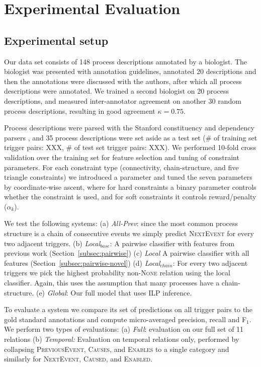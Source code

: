 \section{Experimental Evaluation}

\subsection{Experimental setup}

Our data set consists of 148 process descriptions annotated by a biologist. The biologist was presented with annotation guidelines, annotated 20 descriptions and then the annotations were discussed with the authors, after which all process descriptions were annotated. We trained a second biologist on 20 process descriptions, and measured inter-annotator agreement on another 30 random process descriptions, resulting in good agreement $\kappa=0.75$. 

Process descriptions were parsed with the Stanford constituency and dependency parsers \cite{Klein03,Marneffe06}, and 35 process descriptions were set aside as a test set (\# of training set trigger pairs: XXX, \# of test set trigger pairs: XXX). We performed 10-fold cross validation over the training set for feature selection and tuning of constraint parameters. For each constraint type (connectivity, chain-structure, and five triangle constraints) we introduced a parameter and tuned the seven parameters by coordinate-wise ascent, where for hard constraints a binary parameter controls whether the constraint is used, and for soft constraints it controls reward/penalty ($\alpha_k$).

We test the following systems: (a) \emph{All-Prev}: since the most common process structure is a chain of consecutive events we simply predict \textsc{NextEvent} for every two adjacent triggers. (b) \emph{Local$_{base}$}: A pairwise classifier with features from previous work (Section~\ref{subsec:pairwise}) (c) \emph{Local} A pairwise classifier with all features (Section~\ref{subsec:pairwise-novel}) (d) \emph{Local$_{chain}$}: For every two adjacent triggers we pick the highest probability non-\textsc{None} relation using the local classifier. Again, this uses the assumption that many processes have a chain-structure. (e) \emph{Global}: Our full model that uses ILP inference.

To evaluate a system we compare its set of predictions on all trigger pairs to the gold standard annotations and compute micro-averaged precision, recall and F$_1$. We perform two types of evaluations: (a) \emph{Full}: evaluation on our full set of 11 relations (b) \emph{Temporal:} Evaluation on temporal relations only, performed by collapsing \textsc{PreviousEvent}, \textsc{Causes}, and \textsc{Enables} to a single category and similarly for \textsc{NextEvent}, \textsc{Caused}, and \textsc{Enabled}.

